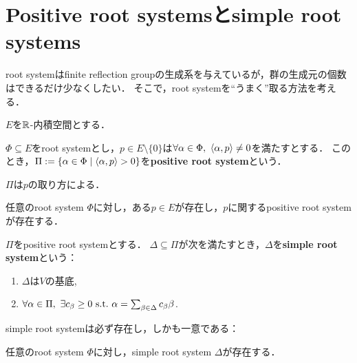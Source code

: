 \newpage
\section{Positive root systemsとsimple root systems}
root systemはfinite reflection groupの生成系を与えているが，群の生成元の個数はできるだけ少なくしたい．
そこで，root systemを``うまく''取る方法を考える．

$E$を$\mathbb{R}$-内積空間とする．

\begin{definition}
  \label{defi:PositiveRootSystem}
  \leanok
  $\Phi \subseteq E$をroot systemとし，$p \in E \setminus \{0\}$は$\forall \alpha \in \Phi,\ \left\langle \alpha, p \right\rangle \ne 0$を満たすとする．
  このとき，$\Pi := \left\lbrace \alpha \in \Phi \mathrel{} \middle| \mathrel{} \left\langle \alpha, p \right\rangle > 0 \right\rbrace$を\textbf{positive root system}という．
\end{definition}

\begin{remark}
  $\Pi$は$p$の取り方による．
\end{remark}

\begin{theorem}
  \label{thm:RootPairing.exists_PositiveRootSystem}
  任意のroot system $\Phi$に対し，ある$p \in E$が存在し，$p$に関するpositive root systemが存在する．
\end{theorem}

\begin{definition}
  \label{defi:SimpleRootSystem}
  \leanok
  $\Pi$をpositive root systemとする．
  $\Delta \subseteq \Pi$が次を満たすとき，$\Delta$を\textbf{simple root system}という：
  \begin{enumerate}[label=(\roman*)]
    \item $\Delta$は$V$の基底,
    \item $\forall \alpha \in \Pi,\ \exists c_\beta \ge 0 \ \text{s.t.}\  \alpha = \sum_{\beta \in \Delta} c_\beta \beta$.
  \end{enumerate}
\end{definition}

simple root systemは必ず存在し，しかも一意である：

\begin{theorem}
  \label{thm:RootPairing.exists_SimpleRootSystem}
  任意のroot system $\Phi$に対し，simple root system $\Delta$が存在する．
\end{theorem}

